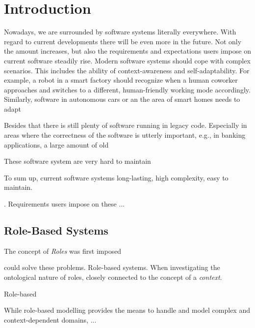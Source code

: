 

\listoftodos

\chapter{Introduction}
\label{ch:introduction}

Nowadays, we are surrounded by software systems literally everywhere. With regard to current
developments there will be even more in the future. Not only the amount increases, but also the
requirements and expectations users impose on current software steadily rise. Modern software
systems should cope with complex scenarios. This includes the ability of context-awareness and
self-adaptability. For example, a robot in a smart factory should recognize when a human coworker
approaches and switches to a different, human-friendly working mode accordingly. Similarly, software
in autonomous cars or an the area of smart homes needs to adapt 


Besides that there is still plenty of software running in legacy code. Especially in areas
where the correctness of the software is utterly important, e.g., in banking applications, a large
amount of old 

These software system are very hard to maintain


To sum up, current software systems long-lasting, high complexity, easy to maintain.



. Requirements
users impose on these ... 




\section{Role-Based Systems}
\label{sec:intro-role-based-systems}

The concept of \emph{Roles} was first imposed


could solve these problems.  Role-based
systems. When investigating the ontological nature of roles, closely connected to the concept of a
\emph{context}.  


Role-based


While role-based modelling provides the means to handle and model complex and context-dependent
domains, ...

